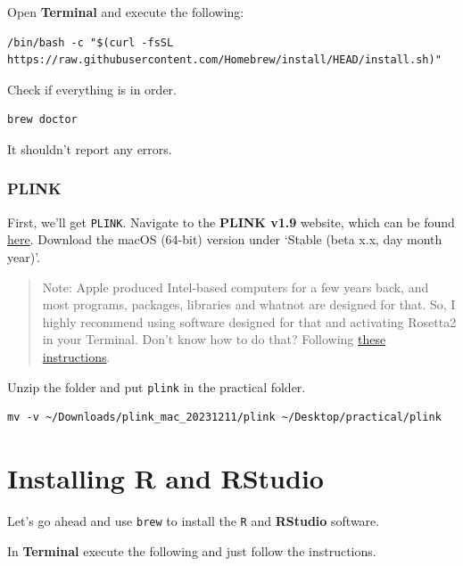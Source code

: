 \documentclass[
]{book}
\newcommand{\passthrough}[1]{#1}
\begin{document}
Open \textbf{Terminal} and execute the following:

\begin{lstlisting}
/bin/bash -c "$(curl -fsSL https://raw.githubusercontent.com/Homebrew/install/HEAD/install.sh)"
\end{lstlisting}

Check if everything is in order.

\begin{lstlisting}
brew doctor
\end{lstlisting}

It shouldn't report any errors.

\hypertarget{plink}{%
\subsubsection{PLINK}\label{plink}}

First, we'll get \passthrough{\lstinline!PLINK!}. Navigate to the \textbf{PLINK v1.9} website, which can be found \href{https://www.cog-genomics.org/plink2}{here}. Download the macOS (64-bit) version under `Stable (beta x.x, day month year)'.

\begin{quote}
Note: Apple produced Intel-based computers for a few years back, and most programs, packages, libraries and whatnot are designed for that. So, I highly recommend using software designed for that and activating Rosetta2 in your Terminal. Don't know how to do that? Following \href{https://support.apple.com/en-us/102527}{these instructions}.
\end{quote}

Unzip the folder and put \passthrough{\lstinline!plink!} in the practical folder.

\begin{lstlisting}
mv -v ~/Downloads/plink_mac_20231211/plink ~/Desktop/practical/plink 
\end{lstlisting}

\hypertarget{installing-r-and-rstudio}{%
\section{Installing R and RStudio}\label{installing-r-and-rstudio}}

Let's go ahead and use \passthrough{\lstinline!brew!} to install the \passthrough{\lstinline!R!} and \textbf{RStudio} software.

In \textbf{Terminal} execute the following and just follow the instructions.
\end{document}
